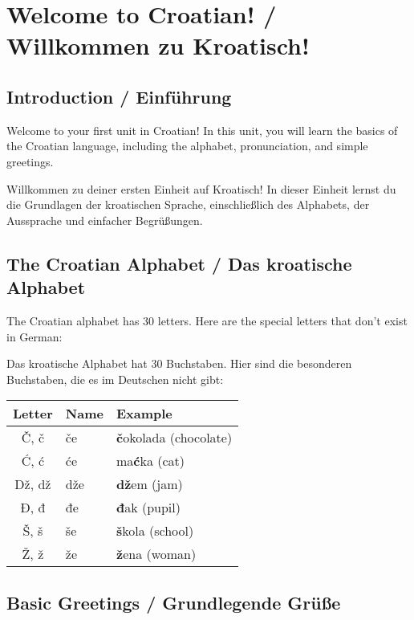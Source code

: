 \chapter{Welcome to Croatian! / Willkommen zu Kroatisch!}

\section{Introduction / Einführung}
Welcome to your first unit in Croatian! In this unit, you will learn the basics of the Croatian language, including the alphabet, pronunciation, and simple greetings.

Willkommen zu deiner ersten Einheit auf Kroatisch! In dieser Einheit lernst du die Grundlagen der kroatischen Sprache, einschließlich des Alphabets, der Aussprache und einfacher Begrüßungen.

\section{The Croatian Alphabet / Das kroatische Alphabet}

\begin{vocabulary}
The Croatian alphabet has 30 letters. Here are the special letters that don't exist in German:

Das kroatische Alphabet hat 30 Buchstaben. Hier sind die besonderen Buchstaben, die es im Deutschen nicht gibt:

\begin{center}
\begin{tabular}{cll}
\toprule
Letter & Name & Example \\
\midrule
Č, č & če & \textbf{č}okolada (chocolate) \\
Ć, ć & će & ma\textbf{ć}ka (cat) \\
Dž, dž & dže & \textbf{dž}em (jam) \\
Đ, đ & đe & \textbf{đ}ak (pupil) \\
Š, š & še & \textbf{š}kola (school) \\
Ž, ž & že & \textbf{ž}ena (woman) \\
\bottomrule
\end{tabular}
\end{center}
\end{vocabulary}

\section{Basic Greetings / Grundlegende Grüße}

